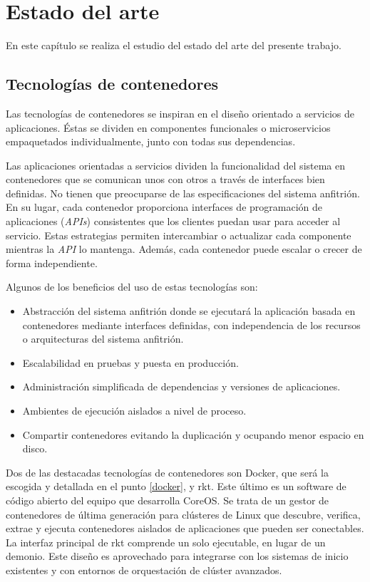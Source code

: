 \chapter{Estado del arte}
\label{cha:state_of_art}

En este capítulo se realiza el estudio del estado del arte del presente trabajo.

\section{Tecnologías de contenedores}

Las tecnologías de contenedores se inspiran en el diseño orientado a servicios de aplicaciones. Éstas se dividen en componentes funcionales o microservicios empaquetados individualmente, junto con todas sus dependencias.

Las aplicaciones orientadas a servicios dividen la funcionalidad del sistema en contenedores que se comunican unos con otros a través de interfaces bien definidas. No tienen que preocuparse de las especificaciones del sistema anfitrión. En su lugar, cada contenedor proporciona interfaces de programación de aplicaciones (\textit{APIs}) consistentes que los clientes puedan usar para acceder al servicio. Estas estrategias permiten intercambiar o actualizar cada componente mientras la \textit{API} lo mantenga. Además, cada contenedor puede escalar o crecer de forma independiente.

Algunos de los beneficios del uso de estas tecnologías son:
\begin{itemize}
\item Abstracción del sistema anfitrión donde se ejecutará la aplicación basada en contenedores mediante interfaces definidas, con independencia de los recursos o arquitecturas del sistema anfitrión.
\item Escalabilidad en pruebas y puesta en producción.
\item Administración simplificada de dependencias y versiones de aplicaciones.
\item Ambientes de ejecución aislados a nivel de proceso.
\item Compartir contenedores evitando la duplicación y ocupando menor espacio en disco.
\end{itemize}

Dos de las destacadas tecnologías de contenedores son Docker\cite{docker}, que será la escogida y detallada en el punto \ref{docker}, y rkt\cite{rkt}. Este último es un software de código abierto del equipo que desarrolla CoreOS\cite{masteringcoreos}. Se trata de un gestor de contenedores de última generación para clústeres de Linux que descubre, verifica, extrae y ejecuta contenedores aislados de aplicaciones que pueden ser conectables. La interfaz principal de rkt comprende un solo ejecutable, en lugar de un demonio. Este diseño es aprovechado para integrarse con los sistemas de inicio existentes y con entornos de orquestación de clúster avanzados.

